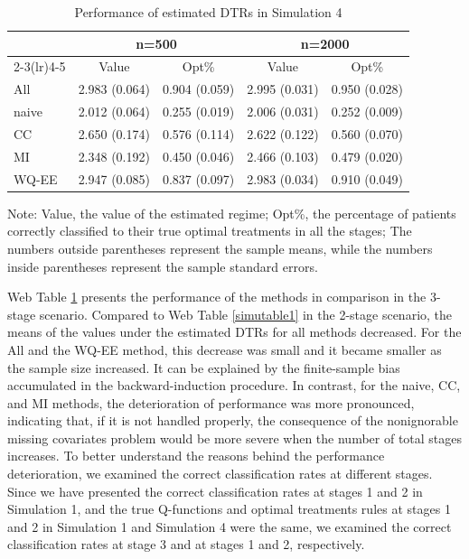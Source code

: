 \documentclass[12pt]{article}
\begin{document}
\begin{table}[htbp]
  \centering
  \caption{Performance of estimated DTRs in Simulation 4}
\begin{threeparttable}
    \begin{tabular}{lcccc}
    \hline
          & \multicolumn{2}{c}{n=500}     & \multicolumn{2}{c}{n=2000} \\
          \cmidrule(lr){2-3}\cmidrule(lr){4-5}
          & Value & Opt\% & Value & Opt\% \\
          \hline
All & 2.983 (0.064) & 0.904 (0.059) & 2.995 (0.031) & 0.950 (0.028) \\
naive & 2.012 (0.064) & 0.255 (0.019) & 2.006 (0.031) & 0.252 (0.009) \\
CC & 2.650 (0.174) & 0.576 (0.114) & 2.622 (0.122) & 0.560 (0.070) \\
MI & 2.348 (0.192) & 0.450 (0.046) & 2.466 (0.103) & 0.479 (0.020) \\
WQ-EE & 2.947 (0.085) & 0.837 (0.097) & 2.983 (0.034) & 0.910 (0.049) \\
    \hline
    \end{tabular}%
\begin{tablenotes}
    \small
    \item Note: Value, the value of the estimated regime; Opt\%, the percentage of patients correctly classified to their true optimal treatments in all the stages;  The numbers outside parentheses represent the sample means, while the numbers inside parentheses represent the sample standard errors.
\end{tablenotes}
  \end{threeparttable}
  \label{simu_3stage_table}%
\end{table}%

Web Table \ref{simu_3stage_table} presents the performance of the methods in comparison in the 3-stage scenario. Compared to Web Table \ref{simutable1} in the 2-stage scenario, the means of the values under the estimated DTRs for all methods decreased. For the All and the WQ-EE method, this decrease was small and it became smaller as the sample size increased. It can be explained by the finite-sample bias accumulated in the backward-induction procedure. In contrast, for the naive, CC, and MI methods, the deterioration of performance was more pronounced, indicating that,  if it is not handled properly, the consequence of the nonignorable missing covariates problem would be more severe when the number of total stages increases. To better understand the reasons behind the performance deterioration, we examined the correct classification rates at different stages. Since we have presented the correct classification rates at stages 1 and 2 in Simulation 1, and the true Q-functions and optimal treatments rules at stages 1 and 2 in Simulation 1 and Simulation 4 were the same, we examined the correct classification rates at stage 3 and at stages 1 and 2, respectively. 
\end{document}
